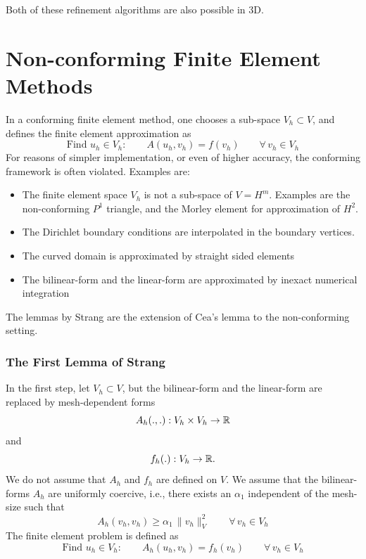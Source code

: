 \bigskip

Both of these refinement algorithms are also possible in 3D.



\section{Non-conforming Finite Element Methods}
\label{sec_nonconforming}
In a conforming finite element method, one chooses a sub-space $V_h \subset V$, and defines the finite element approximation as
$$
\mbox{Find } u_h \in V_h: \qquad A(u_h, v_h) = f(v_h) \qquad \forall \, v_h \in V_{h}
$$
For reasons of simpler implementation, or even of higher accuracy, the 
conforming framework is often violated. Examples are:
\begin{itemize}
\item
The finite element space $V_h$ is not a sub-space of $V = H^m$. 
Examples are the non-conforming $P^1$ triangle, and the Morley element for
approximation of $H^2$.
\item
The Dirichlet boundary conditions are interpolated in the boundary vertices.
\item
The curved domain is approximated by straight sided elements
\item
The bilinear-form and the linear-form are approximated  by 
inexact numerical integration
\end{itemize}

\noindent
The lemmas by Strang are the extension of Cea's lemma to the 
non-conforming setting.


\subsubsection{The First Lemma of Strang}
In the first step, let $V_h \subset V$, but the bilinear-form and the linear-form are replaced by mesh-dependent forms 
$$
A_h(.,.): V_h \times V_h \rightarrow {\mathbb R}
$$ 
and 
$$
f_h(.) : V_h \rightarrow {\mathbb R}.
$$
We do not assume that $A_h$ and $f_h$ are defined on $V$. 
We assume that the bilinear-forms $A_h$ are uniformly coercive, i.e.,
there exists an $\alpha_1$ independent of the mesh-size such that
$$
A_h (v_h, v_h) \geq \alpha_1 \, \| v_h \|_V^2 \qquad \forall \, v_h \in V_h
$$
The finite element problem is defined as 
$$
\mbox{Find } u_h \in V_h: \qquad A_h (u_h, v_h) = f_h (v_h) \qquad \forall \, v_h \in V_h
$$

